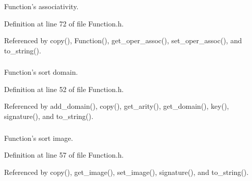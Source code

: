 Function's associativity. 



Definition at line 72 of file Function.h.



Referenced by copy(), Function(), get\_\-oper\_\-assoc(), set\_\-oper\_\-assoc(), and to\_\-string().

\hypertarget{classgenevalmag_1_1Function_ae8e057eeebfabdc524e10e42e54da43c}{
\subsubsection[{f\_\-domain}]{}}
\label{classgenevalmag_1_1Function_ae8e057eeebfabdc524e10e42e54da43c}


Function's sort domain. 



Definition at line 52 of file Function.h.



Referenced by add\_\-domain(), copy(), get\_\-arity(), get\_\-domain(), key(), signature(), and to\_\-string().

\hypertarget{classgenevalmag_1_1Function_a4abfbb9239231cf2a586935546a585f8}{
\subsubsection[{f\_\-image}]{}}
\label{classgenevalmag_1_1Function_a4abfbb9239231cf2a586935546a585f8}


Function's sort image. 



Definition at line 57 of file Function.h.



Referenced by copy(), get\_\-image(), set\_\-image(), signature(), and to\_\-string().

\hypertarget{classgenevalmag_1_1Function_a681af241838253c6b001e92541be7b4c}{
\subsubsection[{f\_\-is\_\-operator}]{}}
\label{classgenevalmag_1_1Function_a681af241838253c6b001e92541be7b4c}


